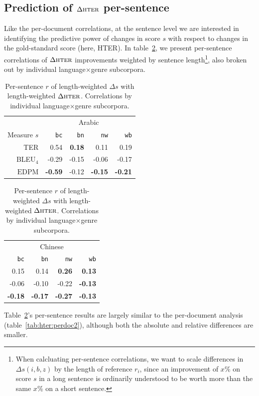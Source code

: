 \documentclass[11pt]{article}
\newcommand{\myEDPM}[0]{\ensuremath{\mathrm{EDPM}}}
\begin{document}
\subsection{Prediction of $\Delta\textsc{hter}$ per-sentence}
Like the per-document correlations, at the sentence level we are
interested in identifying the predictive power of changes in score $s$
with respect to changes in the gold-standard score (here,
\textsc{HTER}).  In table~\ref{tab:hter:persent2}, we present
per-sentence correlations of $\Delta\textsc{hter}$ improvements
weighted by sentence length\footnote{When calcluating per-sentence
  correlations, we want to scale differences in $\Delta s(i,b,z)$ by
  the length of reference $r_i$, since an improvement of $x$\% on
  score $s$ in a long sentence is ordinarily understood to be worth
  more than the same $x$\% on a short sentence.}, also broken out by
individual language$\times$genre subcorpora.

\begin{table}
  \centering
  \begin{tabular}{r|rrrr|}
    & \multicolumn{4}{c|}{Arabic} \\
    Measure $s$& \texttt{bc} & \texttt{bn} & \texttt{nw} & \texttt{wb} \\
    \hline{}
    TER        &  0.54 & 
                  \textbf{0.18}&  0.11 &  0.19 \\
    BLEU$_4$   & -0.29 & -0.15 & -0.06 & -0.17 \\
    \myEDPM &
         \textbf{-0.59}& -0.12 &
                         \textbf{-0.15}&
                                 \textbf{-0.21} \\
  \end{tabular}
  \begin{tabular}{|rrrr|}
    \multicolumn{4}{|c|}{Chinese} \\
    \texttt{bc} & \texttt{bn} & \texttt{nw} & \texttt{wb} \\
    \hline{}
    0.15   &  0.14  &
              \textbf{0.26}& 
                      \textbf{0.13} \\
    -0.06  & -0.10  &-0.22 &
                      \textbf{-0.13}\\
    \textbf{-0.18}&
      \textbf{-0.17}&
             \textbf{-0.27}&
                      \textbf{-0.13} \\
  \end{tabular}
  \caption{Per-sentence $r$ of length-weighted $\Delta s$ with
    length-weighted $\Delta\textsc{hter}$.  Correlations by individual 
    language$\times$genre subcorpora.}
  \label{tab:hter:persent2}
\end{table}
Table~\ref{tab:hter:persent2}'s per-sentence results are largely
similar to the per-document analysis (table~\ref{tab:hter:perdoc2}),
although both the absolute and relative differences are smaller.
\end{document}
